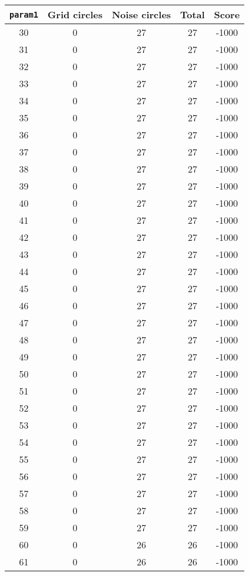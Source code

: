 \documentclass[letterpaper, 12pt]{article}
\begin{document}
\begin{longtable}{|c|c|c|c|c|}
\hline
\textbf{\texttt{param1}} & \textbf{Grid circles} & \textbf{Noise circles} & \textbf{Total} & \textbf{Score} \\
\hline
30 & 0 & 27 & 27 & -1000 \\
\hline
31 & 0 & 27 & 27 & -1000 \\
\hline
32 & 0 & 27 & 27 & -1000 \\
\hline
33 & 0 & 27 & 27 & -1000 \\
\hline
34 & 0 & 27 & 27 & -1000 \\
\hline
35 & 0 & 27 & 27 & -1000 \\
\hline
36 & 0 & 27 & 27 & -1000 \\
\hline
37 & 0 & 27 & 27 & -1000 \\
\hline
38 & 0 & 27 & 27 & -1000 \\
\hline
39 & 0 & 27 & 27 & -1000 \\
\hline
40 & 0 & 27 & 27 & -1000 \\
\hline
41 & 0 & 27 & 27 & -1000 \\
\hline
42 & 0 & 27 & 27 & -1000 \\
\hline
43 & 0 & 27 & 27 & -1000 \\
\hline
44 & 0 & 27 & 27 & -1000 \\
\hline
45 & 0 & 27 & 27 & -1000 \\
\hline
46 & 0 & 27 & 27 & -1000 \\
\hline
47 & 0 & 27 & 27 & -1000 \\
\hline
48 & 0 & 27 & 27 & -1000 \\
\hline
49 & 0 & 27 & 27 & -1000 \\
\hline
50 & 0 & 27 & 27 & -1000 \\
\hline
51 & 0 & 27 & 27 & -1000 \\
\hline
52 & 0 & 27 & 27 & -1000 \\
\hline
53 & 0 & 27 & 27 & -1000 \\
\hline
54 & 0 & 27 & 27 & -1000 \\
\hline
55 & 0 & 27 & 27 & -1000 \\
\hline
56 & 0 & 27 & 27 & -1000 \\
\hline
57 & 0 & 27 & 27 & -1000 \\
\hline
58 & 0 & 27 & 27 & -1000 \\
\hline
59 & 0 & 27 & 27 & -1000 \\
\hline
60 & 0 & 26 & 26 & -1000 \\
\hline
61 & 0 & 26 & 26 & -1000 \\

\end{longtable}
\end{document}
